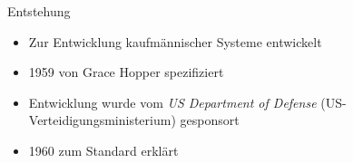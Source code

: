 \begin{slide}{Entstehung}
	\begin{itemize}
		\item{Zur Entwicklung kaufmännischer Systeme entwickelt}
		\item{1959 von Grace Hopper spezifiziert}
		\item{Entwicklung wurde vom \textit{US Department of Defense} (US-Verteidigungsministerium) gesponsort}
		\item{1960 zum Standard erklärt}
	\end{itemize}
\end{slide}
